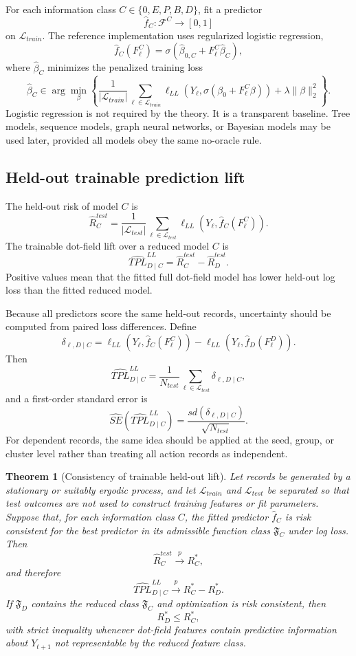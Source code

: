 \documentclass[11pt]{article}
\newtheorem{theorem}{Theorem}
\theoremstyle{remark}
\begin{document}
For each information class $C\in\{0,E,P,B,D\}$, fit a predictor
\[
\widehat f_C:\mathcal F^C\rightarrow[0,1]
\]
on $\mathcal L_{train}$. The reference implementation uses regularized logistic
regression,
\[
\widehat f_C(F^C_\ell)=\sigma\left(\widehat\beta_{0,C}+F_\ell^C\widehat\beta_C\right),
\]
where $\widehat\beta_C$ minimizes the penalized training loss
\[
\widehat\beta_C
\in
\arg\min_\beta
\left\{
\frac{1}{|\mathcal L_{train}|}\sum_{\ell\in\mathcal L_{train}}
\ell_{LL}(Y_\ell,\sigma(\beta_0+F_\ell^C\beta))
+\lambda\|\beta\|_2^2
\right\}.
\]
Logistic regression is not required by the theory. It is a transparent baseline.
Tree models, sequence models, graph neural networks, or Bayesian models may be
used later, provided all models obey the same no-oracle rule.

\subsection{Held-out trainable prediction lift}\label{held-out-trainable-prediction-lift}

The held-out risk of model $C$ is
\[
\widehat R_C^{test}
=
\frac{1}{|\mathcal L_{test}|}
\sum_{\ell\in\mathcal L_{test}}
\ell_{LL}\left(Y_\ell,\widehat f_C(F^C_\ell)\right).
\]
The trainable dot-field lift over a reduced model $C$ is
\[
\widehat{TPL}_{D\mid C}^{LL}
=
\widehat R_C^{test}-\widehat R_D^{test}.
\]
Positive values mean that the fitted full dot-field model has lower held-out log
loss than the fitted reduced model.

Because all predictors score the same held-out records, uncertainty should be
computed from paired loss differences. Define
\[
\delta_{\ell,D\mid C}
=
\ell_{LL}\left(Y_\ell,\widehat f_C(F^C_\ell)\right)
-
\ell_{LL}\left(Y_\ell,\widehat f_D(F^D_\ell)\right).
\]
Then
\[
\widehat{TPL}_{D\mid C}^{LL}=\frac{1}{N_{test}}\sum_{\ell\in\mathcal L_{test}}
\delta_{\ell,D\mid C},
\]
and a first-order standard error is
\[
\widehat{SE}(\widehat{TPL}_{D\mid C}^{LL})
=
\frac{sd(\delta_{\ell,D\mid C})}{\sqrt{N_{test}}}.
\]
For dependent records, the same idea should be applied at the seed, group, or
cluster level rather than treating all action records as independent.

\begin{theorem}[Consistency of trainable held-out lift]\label{thm-trainable-lift-consistency}
Let records be generated by a stationary or suitably ergodic process, and let
$\mathcal L_{train}$ and $\mathcal L_{test}$ be separated so that test outcomes
are not used to construct training features or fit parameters. Suppose that, for
each information class $C$, the fitted predictor $\widehat f_C$ is risk
consistent for the best predictor in its admissible function class
$\mathfrak F_C$ under log loss. Then
\[
\widehat R_C^{test}\xrightarrow{p}R_C^*,
\]
and therefore
\[
\widehat{TPL}_{D\mid C}^{LL}\xrightarrow{p}R_C^*-R_D^*.
\]
If $\mathfrak F_D$ contains the reduced class $\mathfrak F_C$ and optimization is
risk consistent, then
\[
R_D^*\leq R_C^*,
\]
with strict inequality whenever dot-field features contain predictive
information about $Y_{t+1}$ not representable by the reduced feature class.
\end{theorem}
\end{document}
